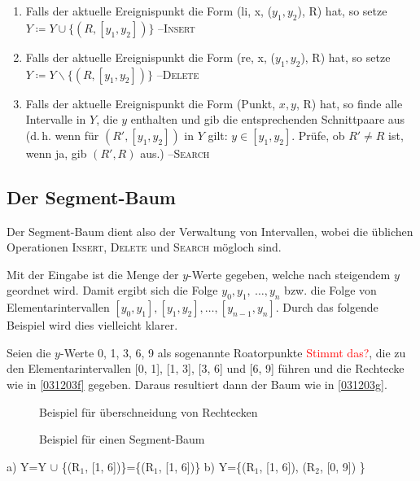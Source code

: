 \documentclass[ngerman,draft,parskip=half*,twoside]{scrreprt}
\theoremstyle{break}
\theoremstyle{nonumberbreak}
\begin{document}
\begin{enumerate}
\item Falls der aktuelle Ereignispunkt die Form (li, x, ($y_1,y_2$), R) hat, so setze $Y\coloneqq Y\cup \{(R, [y_1,y_2])\}$ --\textsc{Insert}
\item Falls der aktuelle Ereignispunkt die Form (re, x, ($y_1,y_2$), R) hat, so setze $Y\coloneqq Y\backslash\{(R, [y_1,y_2])\}$
--\textsc{Delete}
\item Falls der aktuelle Ereignispunkt die Form (Punkt, $x,y$, R) hat, so finde alle Intervalle in $Y$, die $y$  enthalten und gib die
entsprechenden Schnittpaare aus (d.\,h. wenn für $(R', [y_1,y_2])$ in
$Y$ gilt: $y \in [y_1,y_2]$. Prüfe, ob $R'\neq R$ ist, wenn ja, gib $(R', R)$ aus.) --\textsc{Search}
\end{enumerate}
\subsection{Der Segment-Baum}
Der Segment-Baum dient also der Verwaltung von Intervallen, wobei die üblichen Operationen \textsc{Insert}, \textsc{Delete} und
\textsc{Search} mögloch sind.

Mit der Eingabe ist die Menge der $y$-Werte gegeben, welche nach steigendem $y$ geordnet wird. Damit ergibt sich die Folge $y_0,y_1,\
\ldots,y_n$ bzw. die Folge von Elementarintervallen $[y_0,y_1],[y_1,y_2],\ldots,[y_{n-1},y_n]$. Durch das folgende
Beispiel wird dies vielleicht klarer.

Seien die $y$-Werte 0, 1, 3, 6, 9 als sogenannte Roatorpunkte \textcolor{red}{Stimmt das?}, die zu den Elementarintervallen
[0, 1], [1, 3], [3, 6] und [6, 9] führen und die Rechtecke wie in \autoref{031203f} gegeben. Daraus resultiert dann der Baum wie in \autoref{031203g}.

\begin{figure}[H]
\centering

\caption{Beispiel für überschneidung von Rechtecken}
\label{031203f}

\end{figure}

\begin{figure}[H]
\centering
 
\caption{Beispiel für einen Segment-Baum}
\label{031203g}

\end{figure}

 a) Y=Y $\cup$ \{(R$_1$, [1, 6])\}=\{(R$_1$, [1, 6])\} \hspace{2em} b) Y=\{(R$_1$, [1, 6]), (R$_2$, [0, 9]) \}
\end{document}
